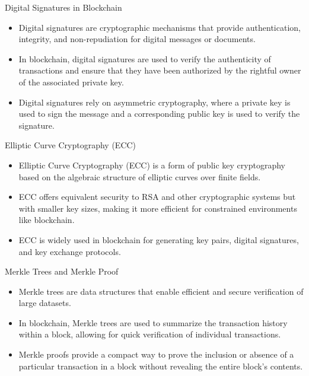 \begin{frame}{Digital Signatures in Blockchain}
    \begin{itemize}
        \item Digital signatures are cryptographic mechanisms that provide authentication, integrity, and non-repudiation for digital messages or documents.
        \item In blockchain, digital signatures are used to verify the authenticity of transactions and ensure that they have been authorized by the rightful owner of the associated private key.
        \item Digital signatures rely on asymmetric cryptography, where a private key is used to sign the message and a corresponding public key is used to verify the signature.
    \end{itemize}
\end{frame}

\begin{frame}[fragile]{Elliptic Curve Cryptography (ECC)}
    \begin{itemize}
        \item Elliptic Curve Cryptography (ECC) is a form of public key cryptography based on the algebraic structure of elliptic curves over finite fields.
        \item ECC offers equivalent security to RSA and other cryptographic systems but with smaller key sizes, making it more efficient for constrained environments like blockchain.
        \item ECC is widely used in blockchain for generating key pairs, digital signatures, and key exchange protocols.
    \end{itemize}

    

    
\end{frame}

\begin{frame}[fragile]{Merkle Trees and Merkle Proof}
    \begin{itemize}
        \item Merkle trees are data structures that enable efficient and secure verification of large datasets.
        \item In blockchain, Merkle trees are used to summarize the transaction history within a block, allowing for quick verification of individual transactions.
        \item Merkle proofs provide a compact way to prove the inclusion or absence of a particular transaction in a block without revealing the entire block's contents.
    \end{itemize}
    
\end{frame}

